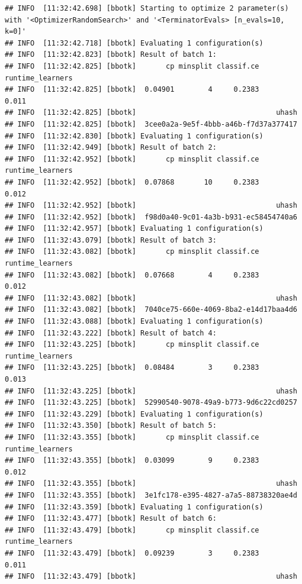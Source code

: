 \documentclass[
]{scrbook}
\begin{document}
\begin{verbatim}
## INFO  [11:32:42.698] [bbotk] Starting to optimize 2 parameter(s) with '<OptimizerRandomSearch>' and '<TerminatorEvals> [n_evals=10, k=0]' 
## INFO  [11:32:42.718] [bbotk] Evaluating 1 configuration(s) 
## INFO  [11:32:42.823] [bbotk] Result of batch 1: 
## INFO  [11:32:42.825] [bbotk]       cp minsplit classif.ce runtime_learners 
## INFO  [11:32:42.825] [bbotk]  0.04901        4     0.2383            0.011 
## INFO  [11:32:42.825] [bbotk]                                 uhash 
## INFO  [11:32:42.825] [bbotk]  3cee0a2a-9e5f-4bbb-a46b-f7d37a377417 
## INFO  [11:32:42.830] [bbotk] Evaluating 1 configuration(s) 
## INFO  [11:32:42.949] [bbotk] Result of batch 2: 
## INFO  [11:32:42.952] [bbotk]       cp minsplit classif.ce runtime_learners 
## INFO  [11:32:42.952] [bbotk]  0.07868       10     0.2383            0.012 
## INFO  [11:32:42.952] [bbotk]                                 uhash 
## INFO  [11:32:42.952] [bbotk]  f98d0a40-9c01-4a3b-b931-ec58454740a6 
## INFO  [11:32:42.957] [bbotk] Evaluating 1 configuration(s) 
## INFO  [11:32:43.079] [bbotk] Result of batch 3: 
## INFO  [11:32:43.082] [bbotk]       cp minsplit classif.ce runtime_learners 
## INFO  [11:32:43.082] [bbotk]  0.07668        4     0.2383            0.012 
## INFO  [11:32:43.082] [bbotk]                                 uhash 
## INFO  [11:32:43.082] [bbotk]  7040ce75-660e-4069-8ba2-e14d17baa4d6 
## INFO  [11:32:43.088] [bbotk] Evaluating 1 configuration(s) 
## INFO  [11:32:43.222] [bbotk] Result of batch 4: 
## INFO  [11:32:43.225] [bbotk]       cp minsplit classif.ce runtime_learners 
## INFO  [11:32:43.225] [bbotk]  0.08484        3     0.2383            0.013 
## INFO  [11:32:43.225] [bbotk]                                 uhash 
## INFO  [11:32:43.225] [bbotk]  52990540-9078-49a9-b773-9d6c22cd0257 
## INFO  [11:32:43.229] [bbotk] Evaluating 1 configuration(s) 
## INFO  [11:32:43.350] [bbotk] Result of batch 5: 
## INFO  [11:32:43.355] [bbotk]       cp minsplit classif.ce runtime_learners 
## INFO  [11:32:43.355] [bbotk]  0.03099        9     0.2383            0.012 
## INFO  [11:32:43.355] [bbotk]                                 uhash 
## INFO  [11:32:43.355] [bbotk]  3e1fc178-e395-4827-a7a5-88738320ae4d 
## INFO  [11:32:43.359] [bbotk] Evaluating 1 configuration(s) 
## INFO  [11:32:43.477] [bbotk] Result of batch 6: 
## INFO  [11:32:43.479] [bbotk]       cp minsplit classif.ce runtime_learners 
## INFO  [11:32:43.479] [bbotk]  0.09239        3     0.2383            0.011 
## INFO  [11:32:43.479] [bbotk]                                 uhash 

\end{verbatim}
\end{document}
